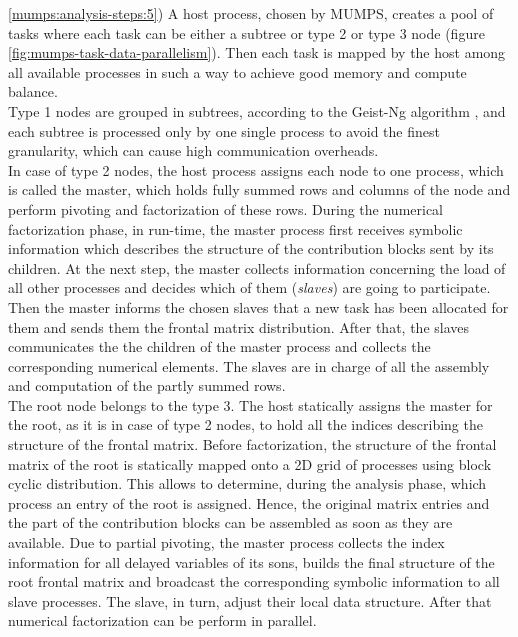\ref{mumps:analysis-steps:5}) A host process, chosen by MUMPS, creates a pool of tasks where each task can be either a subtree or type 2 or type 3 node (figure \ref{fig:mumps-task-data-parallelism}). Then each task is mapped by the host among all available processes in such a way to achieve good memory and compute balance.\\

 
Type 1 nodes are grouped in subtrees, according to the Geist-Ng algorithm \cite{geist1989task}, and each subtree is processed only by one single process to avoid the finest granularity, which can cause high communication overheads. \\


In case of type 2 nodes, the host process assigns each node to one process, which is called the master, which holds fully summed rows and columns of the node and perform pivoting and factorization of these rows. During the numerical factorization phase, in run-time, the master process first receives symbolic information which describes the structure of the contribution blocks sent by its children. At the next step, the master collects information concerning the load of all other processes and decides which of them (\textit{slaves}) are going to participate. Then the master informs the chosen slaves that a new task has been allocated for them and sends them the frontal matrix distribution. After that, the slaves communicates the the children of the master process and collects the corresponding numerical elements. The slaves are in charge of all the assembly and computation of the partly summed rows. \\


The root node belongs to the type 3. The host statically assigns the master for the root, as it is in case of type 2 nodes, to hold all the indices describing the structure of the frontal matrix. Before factorization, the structure of the frontal matrix of the root is statically mapped onto a 2D grid of processes using block cyclic distribution. This allows to determine, during the analysis phase, which process an entry of the root is assigned. Hence, the original matrix entries and the part of the contribution blocks can be assembled as soon as they are available. Due to partial pivoting, the master process collects the index information for all delayed variables of its sons, builds the final structure of the root frontal matrix and broadcast the corresponding symbolic information to all slave processes. The slave, in turn, adjust their local data structure. After that numerical factorization can be perform in parallel.\\


